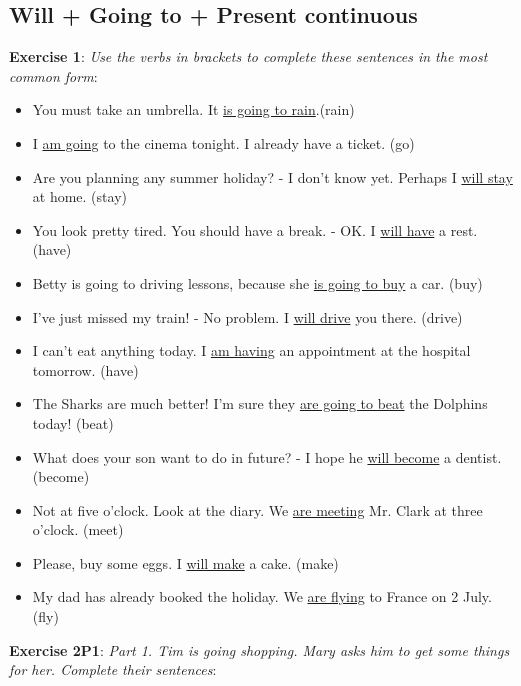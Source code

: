 \subsection{Will + Going to + Present continuous}

\textbf{Exercise 1}: \textit{Use the verbs in brackets to complete these sentences in the most common form}:

\begin{itemize}

\item You must take an umbrella. It \underline{is going to rain}.(rain)
\item I \underline{am going} to the cinema tonight. I already have a ticket. (go)
\item Are you planning any summer holiday? - I don't know yet. Perhaps I \underline{will stay} at home. (stay)
\item You look pretty tired. You should have a break. - OK. I \underline{will have} a rest. (have)
\item Betty is going to driving lessons, because she \underline{is going to buy} a car. (buy)
\item I've just missed my train! - No problem. I \underline{will drive} you there. (drive)
\item I can't eat anything today. I \underline{am having} an appointment at the hospital tomorrow. (have)
\item The Sharks are much better! I'm sure they \underline{are going to beat} the Dolphins today! (beat)
\item What does your son want to do in future? - I hope he \underline{will become} a dentist. (become)
\item Not at five o'clock. Look at the diary. We \underline{are meeting} Mr. Clark at three o'clock. (meet)
\item Please, buy some eggs. I \underline{will make} a cake. (make)
\item My dad has already booked the holiday. We \underline{are flying} to France on 2 July. (fly)

\end{itemize}

\textbf{Exercise 2P1}: \textit{Part 1. Tim is going shopping. Mary asks him to get some things for her. Complete their sentences}:


